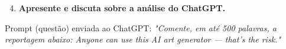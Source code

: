 \begin{enumerate}\setcounter{enumi}{3}\bfseries
    \item  \textbf{Apresente e discuta sobre a análise do ChatGPT.}
\end{enumerate}


Prompt  (questão) enviada ao ChatGPT: 
\textit{"Comente, em até 500 palavras, a reportagem abaixo: Anyone can use this AI art generator — that's the risk."}









